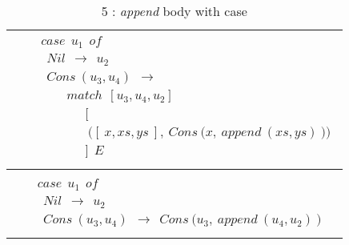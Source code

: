\documentclass[11pt]{article}
\begin{document}
\begin{table}[h!]
{\begin{center}
\begin{tabular}{|c|c|}
\begin{minipage}{3in}
{}
\end {minipage} &
\begin{minipage}{3in}
 {
\begin{align*} 
&case~~u_1~~of\\
&~~Nil~~\to~~u_2\\
&~~Cons~(u_3,u_4)~~\to\\
&\qquad match~~[u_3,u_4,u_2]\\ 
&\qquad\quad~~\bigg[\\ 
&\qquad\quad~~~\Big([~x,xs,ys~],~Cons~\big(x,~append~(xs,ys)~\big)\Big)\\ 
&\qquad\quad~~\bigg]~~E \\
\end{align*}
}
\end {minipage}\\ 

\hline 
\multicolumn{2}{|c|}{}\\ 
\hline
\multicolumn{2}{|c|}{
\begin{minipage}{3in}
 {
\begin{align*} 
&case~~u_1~~of\\
&~~Nil~~\to~~u_2\\
&~~Cons~(u_3,u_4)~~\to~~Cons~\big(u_3,~append~(u_4,u_2)~\big)\\
\end{align*}
}
\end {minipage} 
}
\tabularnewline
\hline
\end{tabular}
\caption{5 : \textit{append} body with {\sf case}}
\label{Pmatch:Ex1StepWise}
\end{center}
}
\end{table}
\end{document}
